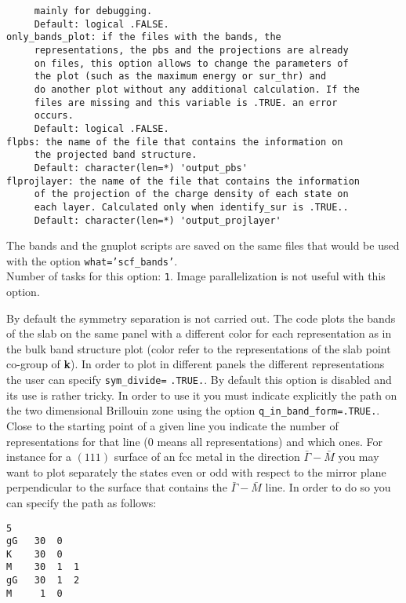 \documentclass[12pt,a4paper,twoside]{report}
\begin{document}
\begin{verbatim}
     mainly for debugging.
     Default: logical .FALSE.
only_bands_plot: if the files with the bands, the 
     representations, the pbs and the projections are already 
     on files, this option allows to change the parameters of 
     the plot (such as the maximum energy or sur_thr) and
     do another plot without any additional calculation. If the 
     files are missing and this variable is .TRUE. an error 
     occurs.
     Default: logical .FALSE.
flpbs: the name of the file that contains the information on 
     the projected band structure.
     Default: character(len=*) 'output_pbs'
flprojlayer: the name of the file that contains the information 
     of the projection of the charge density of each state on 
     each layer. Calculated only when identify_sur is .TRUE..
     Default: character(len=*) 'output_projlayer'
\end{verbatim}


The bands and the gnuplot scripts are saved on the same files that would
be used with the option \texttt{what='scf\_bands'}. \\
Number of tasks for this option: \texttt{1}. Image parallelization is
not useful with this option. 

By default the symmetry separation is not carried out. The code plots the
bands of the slab on the same panel with a different color for each 
representation as in the bulk band structure plot (color refer to the 
representations of the slab point co-group of {\bf k}). 
In order to plot in different panels the different representations
the user can specify \texttt{sym\_divide=} \texttt{.TRUE.}.
By default this option is disabled and its use is rather tricky.
In order to use it you must indicate explicitly the
path on the two dimensional Brillouin zone using the option
\texttt{q\_in\_band\_form=.TRUE.}. Close to the
starting point of a given line you indicate the number of 
representations for that line ($0$ means all representations) and which ones.
For instance for a $(111)$ surface of an fcc metal in the direction 
$\bar \Gamma-\bar M$ you may
want to plot separately the states even or odd with respect to the mirror
plane perpendicular to the surface that contains the $\bar \Gamma-\bar M$
line.
In order to do so you can specify the path as follows:

\begin{verbatim}
5
gG   30  0
K    30  0
M    30  1  1
gG   30  1  2
M     1  0
\end{verbatim}
\end{document}
